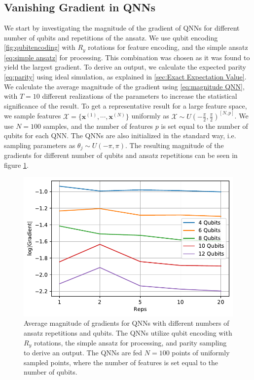 \subsection{Vanishing Gradient in QNNs}\label{sec:Vanishing Gradient for QNNs}
We start by investigating the magnitude of the gradient of QNNs for different number of qubits and repetitions of the ansatz. We use qubit encoding \cref{fig:qubitencoding} with $R_y$ rotations for feature encoding, and the simple ansatz \cref{eq:simple ansatz} for processing. This combination was chosen as it was found to yield the largest gradient. To derive an output, we calculate the expected parity \cref{eq:parity} using ideal simulation, as explained in \cref{sec:Exact Expectation Value}. We calculate the average magnitude of the gradient using \cref{eq:magnitude QNN}, with $T=10$ different realizations of the parameters to increase the statistical significance of the result. To get a representative result for a large feature space, we sample features $\mathcal{X} = \{\boldsymbol{x}^{(1)}, \cdots, \boldsymbol{x}^{(N)}\}$ uniformly as $\mathcal{X} \sim U(-\frac{\pi}{2}, \frac{\pi}{2})^{[N,p]}$. We use $N=100$ samples, and the number of features $p$ is set equal to the number of qubits for each QNN. The QNNs are also initialized in the standard way, i.e. sampling parameters as $\theta_j \sim U(-\pi, \pi)$. The resulting magnitude of the gradients for different number of qubits and ansatz repetitions can be seen in figure \cref{fig:QNN_vanishing}.

\begin{figure}[H]
    \centering
    \includegraphics[width=12cm]{latex/figures/vanishing_gradient_QNN.pdf}
    \caption{Average magnitude of gradients for QNNs with different numbers of ansatz repetitions and qubits. The QNNs utilize qubit encoding with $R_y$ rotations, the simple ansatz for processing, and parity sampling to derive an output. The QNNs are fed $N=100$ points of uniformly sampled points, where the number of features is set equal to the number of qubits.}
    \label{fig:QNN_vanishing}
\end{figure}

